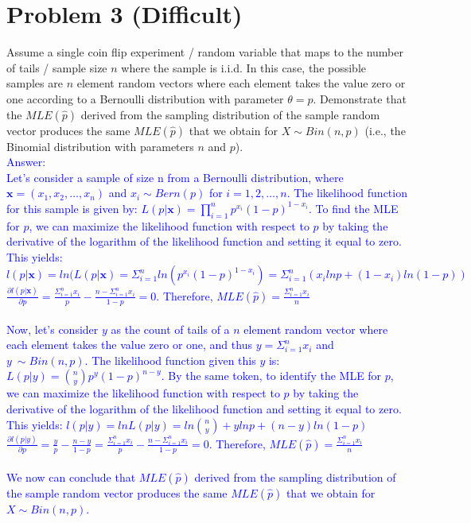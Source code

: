 \documentclass[letterpaper, 11pt]{article}
\begin{document}
\section*{Problem 3 (Difficult)}

Assume a single coin flip experiment / random variable that maps to the number of tails / sample size $n$ where the sample is i.i.d.  In this case, the possible samples are $n$ element random vectors where each element takes the value zero or one according to a Bernoulli distribution with parameter $\theta = p$.  Demonstrate that the $MLE(\hat{p})$ derived from the sampling distribution of the sample random vector produces the same $MLE(\hat{p})$ that we obtain for $ X \sim Bin(n, p)$ (i.e., the Binomial distribution with parameters $n$ and $p$). \\

\textcolor{blue}{Answer:\\ 
Let's consider a sample of size n from a Bernoulli distribution, where $\mathbf{x} = (x_1, x_2, \dots, x_n)$ and $x_i \sim Bern(p)$ for $i=1,2,\dots,n$. The likelihood function for this sample is given by: $L(p | \textbf{x}) = \prod_{i=1}^n p^{x_i}(1-p)^{1-x_i}$. To find the MLE for $p$, we can maximize the likelihood function with respect to $p$ by taking the derivative of the logarithm of the likelihood function and setting it equal to zero. This yields: $l(p|\textbf{x}) = ln(L(p|\textbf{x}) = \Sigma_{i=1}^{n}ln(p^{x_i}(1-p)^{1-x_i}) = \Sigma_{i=1}^{n}(x_ilnp + (1-x_i)ln(1-p))$ \\
$\frac{\partial l(p|\textbf{x})}{\partial p} = \frac{\Sigma_{i=1}^{n}x_i}{p} - \frac{n - \Sigma_{i=1}^{n}x_i}{1-p} = 0$. Therefore, $MLE(\hat{p}) = \frac{\Sigma_{i=1}^{n}x_i}{n}$\\\\
Now, let's consider $y$ as the count of tails of a $n$ element random vector where each element takes the value zero or one, and thus $y = \Sigma_{i=1}^{n} x_i$ and $y ~ \sim Bin(n, p)$. The likelihood function given this $y$ is:
$L(p|y) = \binom{n}{y} p^{y}(1-p)^{n-y}$. By the same token, to identify the MLE for $p$, we can maximize the likelihood function with respect to $p$ by taking the derivative of the logarithm of the likelihood function and setting it equal to zero. \\
This yields: $l(p|y) = lnL(p|y) = ln\binom{n}{y} + ylnp + (n-y)ln(1-p)$\\
$\frac{\partial l(p|y)}{\partial p} = \frac{y}{p} - \frac{n-y}{1-p} =  \frac{\Sigma_{i=1}^{n}x_i}{p} - \frac{n - \Sigma_{i=1}^{n}x_i}{1-p} = 0$. Therefore, $MLE(\hat{p}) = \frac{\Sigma_{i=1}^{n}x_i}{n}$\\\\
We now can conclude that $MLE(\hat{p})$ derived from the sampling distribution of the sample random vector produces the same $MLE(\hat{p})$ that we obtain for $ X \sim Bin(n, p)$. 
}\\
\end{document}
